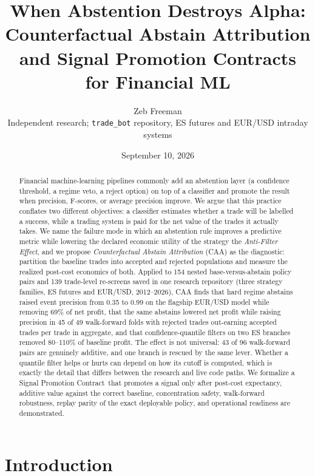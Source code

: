 \documentclass[10pt]{article}
\title{\textbf{When Abstention Destroys Alpha:\\ Counterfactual Abstain Attribution and Signal Promotion Contracts for Financial ML}}
\author{Zeb Freeman\\ \small Independent research; \texttt{trade\_bot} repository, ES futures and EUR/USD intraday systems}
\date{September 10, 2026}
\newcommand{\AF}{Anti-Filter Effect}
\newcommand{\CAA}{Counterfactual Abstain Attribution}
\newcommand{\SPC}{Signal Promotion Contract}
\begin{document}
\maketitle

\begin{abstract}
Financial machine-learning pipelines commonly add an abstention layer (a confidence threshold, a regime veto, a reject option) on top of a classifier and promote the result when precision, F-scores, or average precision improve. We argue that this practice conflates two different objectives: a classifier estimates whether a trade will be labelled a success, while a trading system is paid for the net value of the trades it actually takes. We name the failure mode in which an abstention rule improves a predictive metric while lowering the declared economic utility of the strategy the \emph{\AF}, and we propose \emph{\CAA} (CAA) as the diagnostic: partition the baseline trades into accepted and rejected populations and measure the realized post-cost economics of both. Applied to 154 nested base-versus-abstain policy pairs and 139 trade-level re-screens saved in one research repository (three strategy families, ES futures and EUR/USD, 2012--2026), CAA finds that hard regime abstains raised event precision from 0.35 to 0.99 on the flagship EUR/USD model while removing 69\% of net profit, that the same abstains lowered net profit while raising precision in 45 of 49 walk-forward folds with rejected trades out-earning accepted trades per trade in aggregate, and that confidence-quantile filters on two ES branches removed 80--110\% of baseline profit. The effect is not universal: 43 of 96 walk-forward pairs are genuinely additive, and one branch is rescued by the same lever. Whether a quantile filter helps or hurts can depend on how its cutoff is computed, which is exactly the detail that differs between the research and live code paths. We formalize a \SPC\ that promotes a signal only after post-cost expectancy, additive value against the correct baseline, concentration safety, walk-forward robustness, replay parity of the exact deployable policy, and operational readiness are demonstrated.
\end{abstract}

\section{Introduction}
\end{document}
